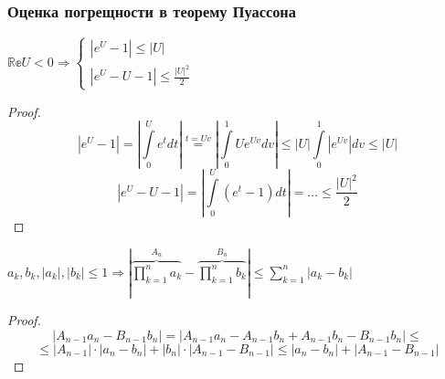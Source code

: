 \documentclass{article}
\begin{document}
    \subsubsection{Оценка погрещности в теорему Пуассона}
    \begin{lemma}
        $\mathbb{Re} U < 0 \Rightarrow \begin{cases}
            |e^U - 1| \le |U|\\
            |e^U - U - 1| \le \frac{|U|^2}{2}
        \end{cases}$
        \begin{proof}
            $$ |e^U - 1| = |\int\limits_0^Ue^tdt| \overset{t=Uv}{=} |\int\limits_0^1 U e^{Uv}dv| \le |U| \int\limits_0^1 |e^{Uv}| dv \le |U|$$
            $$ |e^U - U - 1| = |\int\limits_0^U(e^t - 1) dt| = \dots \le \frac{|U|^2}{2}$$
        \end{proof}
    \end{lemma}
    \begin{lemma}
        $a_k, b_k, |a_k|, |b_k| \le 1 \Rightarrow |\overbrace{\prod\limits_{k=1}^n a_k}^{A_n} - \overbrace{\prod\limits_{k=1}^n b_k}^{B_n}| \le \sum\limits_{k=1}^n|a_k-b_k|$
        \begin{proof}
            $$|A_{n - 1} a_n - B_{n-1} b_n| = |A_{n-1} a_n - A_{n-1} b_n + A_{n-1} b_n - B_{n-1} b_n| \le $$
            $$\le |A_{n-1}| \cdot |a_n - b_n | + |b_n|\cdot|A_{n-1} - B_{n-1}| \le |a_n - b_n| + |A_{n-1} - B_{n-1}|$$
        \end{proof}
    \end{lemma}
\end{document}
